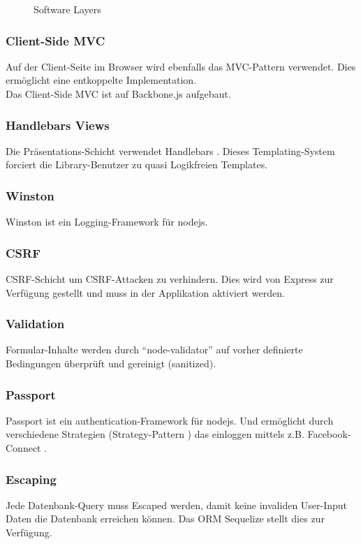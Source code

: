 \begin{figure}[ht!]
	\centering{
		
	}

	\caption{Software Layers}
\end{figure}

\subsubsection*{Client-Side MVC}
Auf der Client-Seite im Browser wird ebenfalls das MVC-Pattern \cite{MVC} verwendet. Dies ermöglicht eine entkoppelte Implementation.\\
Das Client-Side MVC ist auf Backbone.js \cite{Backbonejs} aufgebaut.

\subsubsection*{Handlebars Views}
Die Präsentations-Schicht verwendet Handlebars \cite{Handlebars}. Dieses Templating-System forciert die Library-Benutzer zu quasi Logikfreien Templates.

\subsubsection*{Winston}
Winston \cite{Winston} ist ein Logging-Framework für \gls{nodejs}.

\subsubsection*{CSRF}
\gls{CSRF}-Schicht um CSRF-Attacken zu verhindern. Dies wird von Express zur Verfügung \cite{ExpressjsCSRF} gestellt und muss in der Applikation aktiviert werden.

\subsubsection*{Validation}
Formular-Inhalte werden durch ``node-validator'' \cite{nodevalidator} auf vorher definierte Bedingungen überprüft und gereinigt (sanitized).

\subsubsection*{Passport}
Passport \cite{Passportjs} ist ein authentication-Framework für \gls{nodejs}. Und ermöglicht durch verschiedene Strategien (Strategy-Pattern \cite{StrategyPattern}) das einloggen mittels z.B. Facebook-Connect \cite{FacebookConnect}.

\subsubsection*{Escaping}
Jede Datenbank-Query muss Escaped werden, damit keine invaliden User-Input Daten die Datenbank erreichen können. Das ORM Sequelize \cite{Sequelize} stellt dies zur Verfügung.